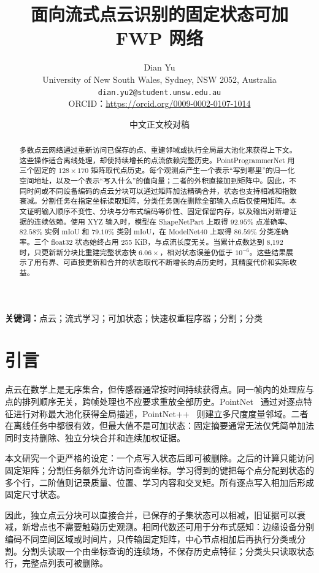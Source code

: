 \documentclass[UTF8,a4paper,11pt,fontset=windows]{ctexart}
\title{面向流式点云识别的固定状态可加 FWP 网络}
\author{Dian Yu\\
University of New South Wales, Sydney, NSW 2052, Australia\\
\texttt{dian.yu2@student.unsw.edu.au}\\
ORCID：\url{https://orcid.org/0009-0002-0107-1014}}
\date{中文正文校对稿}
\begin{document}
\maketitle

\begin{abstract}
多数点云网络通过重新访问已保存的点、重建邻域或执行全局最大池化来获得上下文。这些操作适合离线处理，却使持续增长的点流依赖完整历史。PointProgrammerNet 用三个固定的 $128\times170$ 矩阵取代点历史。每个观测点产生一个表示“写到哪里”的归一化空间地址，以及一个表示“写入什么”的值向量；二者的外积直接加到矩阵中。因此，不同时间或不同设备编码的点云分块可以通过矩阵加法精确合并，状态也支持相减和指数衰减。分割任务在指定坐标读取矩阵，分类任务则在删除全部输入点后仅使用矩阵。本文证明输入顺序不变性、分块与分布式编码等价性、固定保留内存，以及输出对新增证据的连续依赖。使用 XYZ 输入时，模型在 ShapeNetPart 上取得 $92.95\%$ 点准确率、$82.58\%$ 实例 mIoU 和 $79.10\%$ 类别 mIoU，在 ModelNet40 上取得 $86.59\%$ 分类准确率。三个 float32 状态始终占用 255 KiB，与点流长度无关。当累计点数达到 8,192 时，只更新新分块比重建完整状态快 $6.06\times$，相对状态误差仍低于 $10^{-6}$。这些结果展示了用有界、可直接更新和合并的状态取代不断增长的点历史时，其精度代价和实际收益。
\end{abstract}

\noindent\textbf{关键词：}点云；流式学习；可加状态；快速权重程序器；分割；分类

\section{引言}

点云在数学上是无序集合，但传感器通常按时间持续获得点。同一帧内的处理应与点的排列顺序无关，跨帧处理也不应要求重放全部历史。PointNet~\cite{qi2017pointnet} 通过对逐点特征进行对称最大池化获得全局描述，PointNet++~\cite{qi2017pointnetplusplus} 则建立多尺度度量邻域。二者在离线任务中都很有效，但最大值不是可加状态：固定摘要通常无法仅凭简单加法同时支持删除、独立分块合并和连续加权证据。

本文研究一个更严格的设定：一个点写入状态后即可被删除。之后的计算只能访问固定矩阵；分割任务额外允许访问查询坐标。学习得到的键把每个点分配到状态的多个行，二阶值则记录质量、位置、学习内容和交叉矩。所有逐点写入相加后形成固定尺寸状态。

因此，独立点云分块可以直接合并，已保存的子集状态可以相减，旧证据可以衰减，新增点也不需要触碰历史观测。相同代数还可用于分布式感知：边缘设备分别编码不同空间区域或时间片，只传输固定矩阵，中心节点相加后再执行分类或分割。分割头读取一个由坐标查询的连续场，不保存历史点特征；分类头只读取状态行，完整点列表可被删除。
\end{document}
